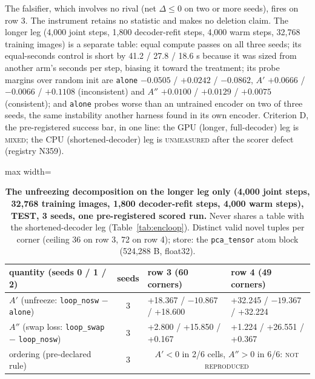 \documentclass{article} %
\begin{document}
\noindent The falsifier, which involves no rival (net $\Delta\le0$ on two or more seeds), fires on
row 3.
The instrument retains no statistic and makes no deletion claim. %
The longer leg (4,000 joint steps, 1,800 decoder-refit steps, 4,000 warm steps, 32,768 training
images) is a separate table: equal compute passes on all three seeds; its equal-seconds control is
short by 41.2 / 27.8 / 18.6 s because it was sized from another arm's seconds per step, biasing it
toward the treatment; its probe margins over random init are \texttt{alone} $-0.0505$ / $+0.0242$ /
$-0.0862$, $A'$ $+0.0666$ / $-0.0066$ / $+0.1108$ (inconsistent) and $A''$ $+0.0100$ / $+0.0129$ /
$+0.0075$ (consistent); and \texttt{alone} probes worse than an untrained encoder on two of three
seeds, the same instability another harness found in its own encoder. %
Criterion D, the pre-registered success bar, in one line: the GPU (longer, full-decoder) leg is \textsc{mixed}; the CPU (shortened-decoder) leg is \textsc{unmeasured} after the scorer defect (registry N359). %

\begin{table}[h]
\centering\small
\caption{\textbf{The unfreezing decomposition on the longer leg only (4,000 joint steps, %
32,768 training images, 1,800 decoder-refit steps, 4,000 warm steps), TEST, 3 seeds, %
one pre-registered scored run.} Never shares a table with the shortened-decoder leg
(Table~\ref{tab:encloop}). Distinct valid novel tuples per corner (ceiling 36 on row 3, 72 on
row 4); store: the \texttt{pca\_tensor} atom block (524,288 B, float32).} %
\label{tab:bard-gpu}
\setlength{\tabcolsep}{2.4pt}
\begin{adjustbox}{max width=\linewidth}\begin{tabular}{lcp{4.6cm}p{4.6cm}}
\toprule
quantity (seeds 0 / 1 / 2) & seeds & row 3 (60 corners) & row 4 (49 corners) \\ %
\midrule
$A'$ (unfreeze: \texttt{loop\_nosw} $-$ \texttt{alone}) & 3 & +18.367 / $-10.867$ / +18.600 & +32.245 / $-19.367$ / +32.224 \\
$A''$ (swap loss: \texttt{loop\_swap} $-$ \texttt{loop\_nosw}) & 3 & +2.800 / +15.850 / +0.167 & +1.224 / +26.551 / +0.367 \\
ordering (pre-declared rule) & 3 & \multicolumn{2}{c}{$A'<0$ in 2/6 cells, $A''>0$ in 6/6: \textsc{not reproduced}} \\
\bottomrule
\end{tabular}\end{adjustbox}
\end{table}
\end{document}
